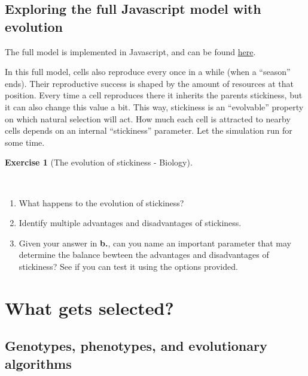 \documentclass[
  letterpaper,
  DIV=11,
  numbers=noendperiod]{scrreprt}
\providecommand{\tightlist}{%
  \setlength{\itemsep}{0pt}\setlength{\parskip}{0pt}}\usepackage{longtable,booktabs,array}
\theoremstyle{definition}
\newtheorem{exercise}{Exercise}[chapter]
\theoremstyle{remark}
\begin{document}
\section{Exploring the full Javascript model with
evolution}\label{exploring-the-full-javascript-model-with-evolution}

The full model is implemented in Javascript, and can be found
\href{https://tbb.bio.uu.nl/bvd/simulations/collective_evolving_multi/}{here}.

In this full model, cells also reproduce every once in a while (when a
``season'' ends). Their reproductive success is shaped by the amount of
resources at that position. Every time a cell reproduces there it
inherits the parents stickiness, but it can also change this value a
bit. This way, stickiness is an ``evolvable'' property on which natural
selection will act. How much each cell is attracted to nearby cells
depends on an internal ``stickiness'' parameter. Let the simulation run
for some time.

\begin{exercise}[The evolution of stickiness -
Biology]\protect\hypertarget{exr-jsmodel}{}\label{exr-jsmodel}

~

\begin{enumerate}
\def\labelenumi{\alph{enumi}.}
\tightlist
\item
  What happens to the evolution of stickiness?
\item
  Identify multiple advantages and disadvantages of stickiness.
\item
  Given your answer in \textbf{b.}, can you name an important parameter
  that may determine the balance bewteen the advantages and
  disadvantages of stickiness? See if you can test it using the options
  provided.
\end{enumerate}

\end{exercise}

\chapter{What gets selected?}\label{what-gets-selected}

\section{Genotypes, phenotypes, and evolutionary
algorithms}\label{genotypes-phenotypes-and-evolutionary-algorithms}
\end{document}
